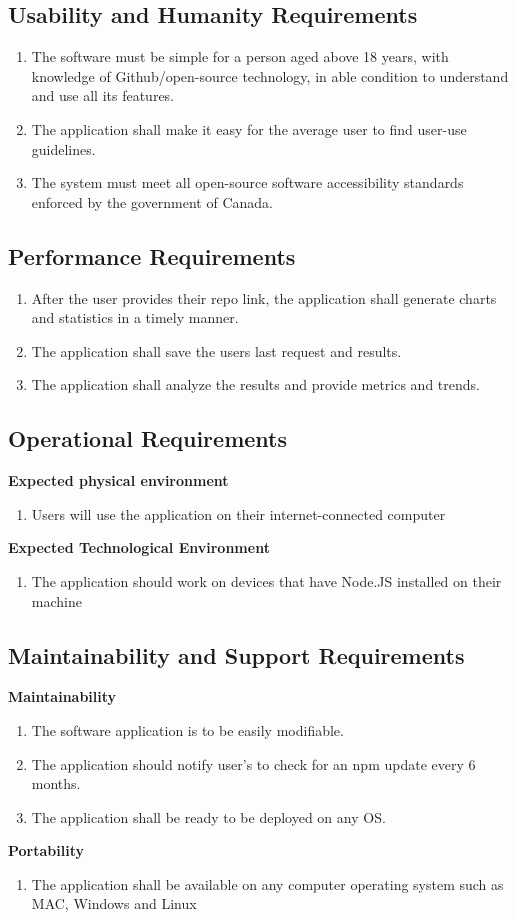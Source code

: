 \documentclass{article}
\begin{document}
\subsection{Usability and Humanity Requirements}
\begin{enumerate}
\item The software must be simple for a person aged above 18 years, with knowledge of Github/open-source technology, in able condition to understand and use all its features.
\item The application shall make it easy for the average user to find user-use guidelines.
\item The system must meet all open-source software accessibility standards enforced by the government of Canada. 
\end{enumerate}
\subsection{Performance Requirements}
\begin{enumerate}
\item After the user provides their repo link, the application shall generate charts and statistics in a timely manner. 
\item The application shall save the users last request and results. 
\item The application shall analyze the results and provide metrics and trends. 
\end{enumerate}
\subsection{Operational Requirements}
\textbf{Expected physical environment }
\begin{enumerate}
\item Users will use the application on their internet-connected computer 
\end{enumerate}
\textbf{Expected Technological Environment }
\begin{enumerate}
\item The application should work on devices that have Node.JS installed on their machine 
\end{enumerate}
\subsection{Maintainability and Support Requirements}
\textbf{Maintainability} 
\begin{enumerate}
\item The software application is to be easily modifiable.
\item The application should notify user's to check for an npm update every 6 months. 
\item The application shall be ready to be deployed on any OS. 
\end{enumerate}
\textbf{Portability} 
\begin{enumerate}
\item The application shall be available on any computer operating system such as MAC, Windows and Linux
\end{enumerate}
\end{document}
